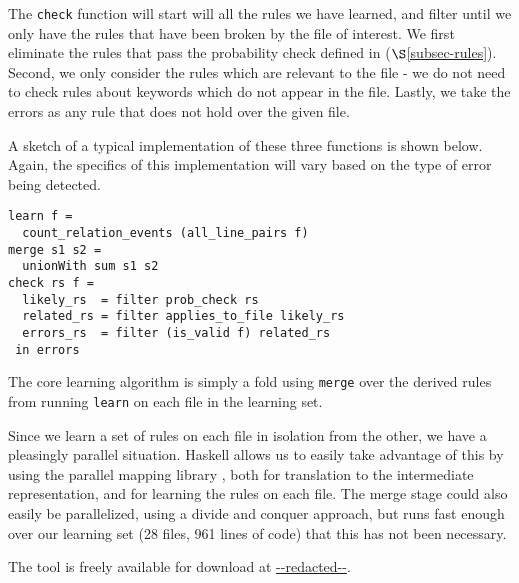 The \lstinline{check} function will start will all the rules we have learned, and filter until we only have the rules that have been broken by the file of interest.
We first eliminate the rules that pass the probability check defined in ($\S$\ref{subsec-rules}).
Second, we only consider the rules which are relevant to the file - we do not need to check rules about keywords which do not appear in the file.
Lastly, we take the errors as any rule that does not hold over the given file.

A sketch of a typical implementation of these three functions is shown below. Again, the specifics of this implementation will vary based on the type of error being detected. 

\begin{lstlisting}
learn f = 
  count_relation_events (all_line_pairs f)
merge s1 s2 = 
  unionWith sum s1 s2
check rs f = 
  likely_rs  = filter prob_check rs
  related_rs = filter applies_to_file likely_rs
  errors_rs  = filter (is_valid f) related_rs
 in errors
\end{lstlisting}

The core learning algorithm is simply a fold using \lstinline{merge} over the derived rules from running \lstinline{learn} on each file in the learning set.


Since we learn a set of rules on each file in isolation from the other, we have a pleasingly parallel situation.
Haskell allows us to easily take advantage of this by using the parallel
mapping library \cite{parallel}, both for translation to the intermediate representation, and for learning the rules on each file.
The merge stage could also easily be parallelized, using a divide and conquer approach, but \app runs fast enough over our learning set (28 files, 961 lines of code) that this has not been necessary.

The tool is freely available for download at \url{--redacted--}.